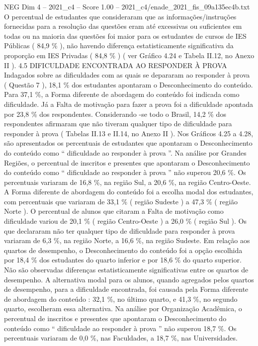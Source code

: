 \begin{textsample}{NEG Dim 4 – 2021\_c4 – Score 1.00 – 2021\_c4/enade\_2021\_fis\_09a135ec4b.txt}
O percentual de estudantes que consideraram que as informações/instruções fornecidas para a resolução das questões eram até excessivas ou suficientes em todas ou na maioria das questões foi maior para os estudantes de cursos de IES Públicas ( 84,9 \% ), não havendo diferença estatisticamente significativa da proporção em IES Privadas ( 84,8 \% ) ( ver Gráfico 4.24 e Tabela II.12, no Anexo II ). 4.5 DIFICULDADE ENCONTRADA AO RESPONDER À PROVA Indagados sobre as dificuldades com as quais se depararam ao responder à prova ( Questão 7 ), 18,1 \% dos estudantes apontaram o Desconhecimento do conteúdo.
Para 37,1 \%, a Forma diferente de abordagem do conteúdo foi indicada como dificuldade.
Já a Falta de motivação para fazer a prova foi a dificuldade apontada por 23,8 \% dos respondentes.
Considerando -se todo o Brasil, 14,2 \% dos respondentes afirmaram que não tiveram qualquer tipo de dificuldade para responder à prova ( Tabelas II.13 e II.14, no Anexo II ).
Nos Gráficos 4.25 a 4.28, são apresentados os percentuais de estudantes que apontaram o Desconhecimento do conteúdo como “ dificuldade ao responder à prova ”.
Na análise por Grandes Regiões, o percentual de inscritos e presentes que apontaram o Desconhecimento do conteúdo como “ dificuldade ao responder à prova ” não superou 20,6 \%.
Os percentuais variaram de 16,8 \%, na região Sul, a 20,6 \%, na região Centro-Oeste.
A Forma diferente de abordagem do conteúdo foi a escolha modal dos estudantes, com percentuais que variaram de 33,1 \% ( região Sudeste ) a 47,3 \% ( região Norte ).
O percentual de alunos que citaram a Falta de motivação como dificuldade variou de 20,1 \% ( região Centro-Oeste ) a 26,0 \% ( região Sul ).
Os que declararam não ter qualquer tipo de dificuldade para responder à prova variaram de 6,3 \%, na região Norte, a 16,6 \%, na região Sudeste.
Em relação aos quartos de desempenho, o Desconhecimento do conteúdo foi a opção escolhida por 18,4 \% dos estudantes do quarto inferior e por 18,6 \% do quarto superior.
Não são observadas diferenças estatisticamente significativas entre os quartos de desempenho.
A alternativa modal para os alunos, quando agregados pelos quartos de desempenho, para a dificuldade encontrada, foi causada pela Forma diferente de abordagem do conteúdo : 32,1 \%, no último quarto, e 41,3 \%, no segundo quarto, escolheram essa alternativa.
Na análise por Organização Acadêmica, o percentual de inscritos e presentes que apontaram o Desconhecimento do conteúdo como “ dificuldade ao responder à prova ” não superou 18,7 \%.
Os percentuais variaram de 0,0 \%, nas Faculdades, a 18,7 \%, nas Universidades.

\end{textsample}
